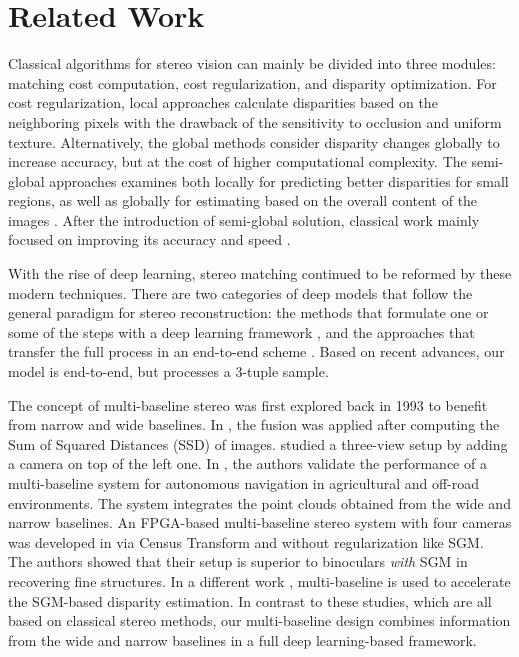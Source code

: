 \documentclass[10pt,twocolumn,letterpaper]{article}
\begin{document}
\section{Related Work} 
\label{RelatedWork}
Classical algorithms for stereo vision can mainly be divided into three modules: matching cost computation, cost regularization, and disparity optimization. For cost regularization, local approaches calculate disparities based on the neighboring pixels \cite{chen2001fast,muhlmann2002calculating} with the drawback of the sensitivity to occlusion and uniform texture. Alternatively, the global methods consider disparity changes globally to increase accuracy, but at the cost of higher computational complexity. The semi-global approaches examines both locally for predicting better disparities for small regions, as well as globally for estimating based on the overall content of the images \cite{hirschmuller2005accurate}. After the introduction of semi-global solution, classical work mainly focused on improving its accuracy and speed \cite{gehrig2007improving,michael2013real}.

With the rise of deep learning, stereo matching continued to be reformed by these modern techniques. There are two categories of deep models that follow the general paradigm for stereo reconstruction: the methods that formulate one or some of the steps with a deep learning framework \cite{vzbontar2016stereo,batsos2018cbmv,seki2017sgm}, and the approaches that transfer the full process in an end-to-end scheme \cite{mayer2016large, kendall2017end,chang2018pyramid,guo2019group,zhang2019ga,shamsafar2021mobilestereonet}. Based on recent advances, our model is end-to-end, but processes a 3-tuple sample.

The concept of multi-baseline stereo was first explored back in 1993 \cite{okutomi1993multiple} to benefit from narrow and wide baselines. In \cite{okutomi1993multiple}, the fusion was applied after computing the Sum of Squared Distances (SSD) of images. \cite{kallwies2018effective,kallwies2020triple} studied a three-view setup by adding a camera on top of the left one. In \cite{milella20143d}, the authors validate the performance of a multi-baseline system for autonomous navigation in agricultural and off-road environments. The system integrates the point clouds obtained from the wide and narrow baselines. An FPGA-based multi-baseline stereo system with four cameras was developed in \cite{honegger2017embedded} via Census Transform and without regularization like SGM. The authors showed that their setup is superior to binoculars \emph{with} SGM in recovering fine structures. In a different work \cite{wang2020stereo}, multi-baseline is used to accelerate the SGM-based disparity estimation. In contrast to these studies, which are all based on classical stereo methods, our multi-baseline design combines information from the wide and narrow baselines in a full deep learning-based framework.
\end{document}

